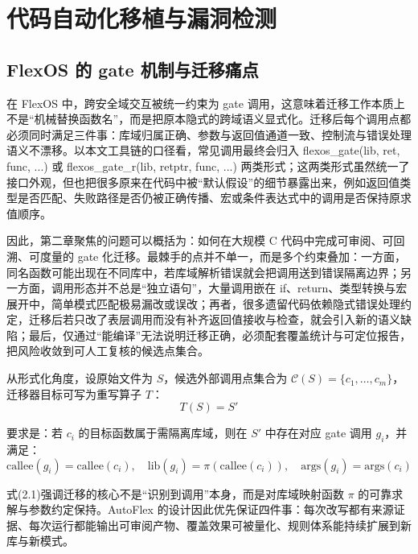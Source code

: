 \documentclass[UTF8,a4paper,12pt]{ctexart}
\numberwithin{equation}{section}
\begin{document}
\section{代码自动化移植与漏洞检测}

\subsection{FlexOS 的 gate
机制与迁移痛点}


在 FlexOS 中，跨安全域交互被统一约束为 gate
调用，这意味着迁移工作本质上不是``机械替换函数名''，而是把原本隐式的跨域语义显式化。迁移后每个调用点都必须同时满足三件事：库域归属正确、参数与返回值通道一致、控制流与错误处理语义不漂移。以本文工具链的口径看，常见调用最终会归入
flexos\_gate(lib, ret, func, ...) 或 flexos\_gate\_r(lib, retptr, func,
...)
两类形式；这两类形式虽然统一了接口外观，但也把很多原来在代码中被``默认假设''的细节暴露出来，例如返回值类型是否匹配、失败路径是否仍被正确传播、宏或条件表达式中的调用是否保持原求值顺序。

因此，第二章聚焦的问题可以概括为：如何在大规模 C
代码中完成可审阅、可回溯、可度量的 gate
化迁移。最棘手的点并不单一，而是多个约束叠加：一方面，同名函数可能出现在不同库中，若库域解析错误就会把调用送到错误隔离边界；另一方面，调用形态并不总是``独立语句''，大量调用嵌在
if、return、类型转换与宏展开中，简单模式匹配极易漏改或误改；再者，很多遗留代码依赖隐式错误处理约定，迁移后若只改了表层调用而没有补齐返回值接收与检查，就会引入新的语义缺陷；最后，仅通过``能编译''无法说明迁移正确，必须配套覆盖统计与可定位报告，把风险收敛到可人工复核的候选点集合。

从形式化角度，设原始文件为 \(S\)，候选外部调用点集合为
\(\mathcal{C}(S)=\{c_1,\dots,c_m\}\)，迁移器目标可写为重写算子 \(T\)：
\begin{equation}
T(S) = S' 
\end{equation}

要求是：若 \(c_i\) 的目标函数属于需隔离库域，则在 \(S'\) 中存在对应 gate
调用 \(g_i\)，并满足：
\begin{equation}
\text{callee}(g_i)=\text{callee}(c_i),\quad \text{lib}(g_i)=\pi(\text{callee}(c_i)),\quad \text{args}(g_i)=\text{args}(c_i)
\end{equation}

式(2.1)强调迁移的核心不是``识别到调用''本身，而是对库域映射函数 \(\pi\)
的可靠求解与参数约定保持。AutoFlex
的设计因此优先保证四件事：每次改写都有来源证据、每次运行都能输出可审阅产物、覆盖效果可被量化、规则体系能持续扩展到新库与新模式。
\end{document}
